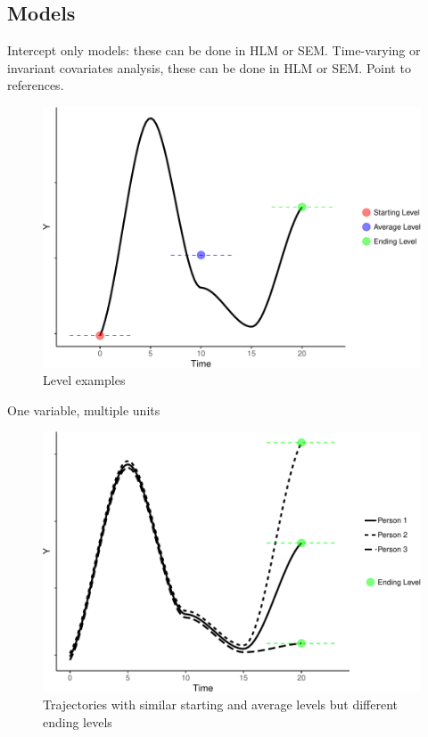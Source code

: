 \documentclass[english,,man]{apa6}
\theoremstyle{definition}
\theoremstyle{definition}
\theoremstyle{definition}
\theoremstyle{remark}
\begin{document}
\hypertarget{models}{%
\subsection{Models}\label{models}}

Intercept only models: these can be done in HLM or SEM. Time-varying or
invariant covariates analysis, these can be done in HLM or SEM. Point to
references.

\begin{figure}
\centering
\includegraphics{figures/unnamed-chunk-8-1.pdf}
\caption{\label{fig:unnamed-chunk-8}Level examples\label{level}}
\end{figure}

One variable, multiple units

\begin{figure}
\centering
\includegraphics{figures/unnamed-chunk-9-1.pdf}
\caption{\label{fig:unnamed-chunk-9}Trajectories with similar starting and
average levels but different ending levels\label{level_var}}
\end{figure}
\end{document}
